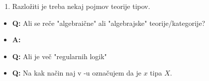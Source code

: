 \documentclass[12pt,a4paper]{article}
\begin{document}
    \begin{enumerate}
        \item Razložiti je treba nekaj pojmov teorije tipov.
    \end{enumerate}
    \begin{itemize}
        \item \textbf{Q:} Ali se reče "algebraične" ali "algebrajske" teorije/kategorije?
        \item \textbf{A:}
        \item \textbf{Q:} Ali je več "regularnih logik"
        \item \textbf{Q:} Na kak način naj v \Latex-u označujem da je $x$ tipa $X$.
    \end{itemize}
\end{document}
